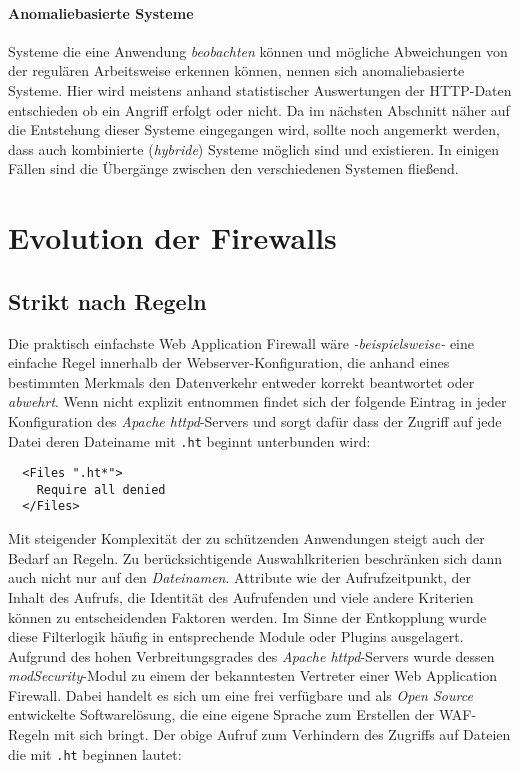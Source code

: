 \paragraph{Anomaliebasierte Systeme}
Systeme die eine Anwendung \emph{beobachten} können und mögliche Abweichungen von der regulären Arbeitsweise erkennen können, nennen sich anomaliebasierte Systeme. Hier wird meistens anhand statistischer Auswertungen der HTTP-Daten entschieden ob ein Angriff erfolgt oder nicht. Da im nächsten Abschnitt näher auf die Entstehung dieser Systeme eingegangen wird, sollte noch angemerkt werden, dass auch kombinierte (\emph{hybride}) Systeme möglich sind und existieren. In einigen Fällen sind die Übergänge zwischen den verschiedenen Systemen fließend.

\section{Evolution der Firewalls}
\label{sec:relatedwork}

\subsection{Strikt nach Regeln}

Die praktisch einfachste Web Application Firewall wäre \emph{-beispielsweise-} eine einfache Regel innerhalb der Webserver-Konfiguration, die anhand eines bestimmten Merkmals den Datenverkehr entweder korrekt beantwortet oder \glqq\emph{abwehrt}\grqq. Wenn nicht explizit entnommen findet sich der folgende Eintrag in jeder Konfiguration des \emph{Apache httpd}-Servers und sorgt dafür dass der Zugriff auf jede Datei deren Dateiname mit \texttt{.ht} beginnt unterbunden wird:

\begin{lstlisting}
  <Files ".ht*">
    Require all denied
  </Files>
\end{lstlisting}

Mit steigender Komplexität der zu schützenden Anwendungen steigt auch der Bedarf an Regeln. Zu berücksichtigende Auswahlkriterien beschränken sich dann auch nicht nur auf den \glqq\emph{Dateinamen}\grqq. Attribute wie der Aufrufzeitpunkt, der Inhalt des Aufrufs, die Identität des Aufrufenden und viele andere Kriterien können zu entscheidenden Faktoren werden. Im Sinne der Entkopplung wurde diese Filterlogik häufig in entsprechende Module oder Plugins ausgelagert. Aufgrund des hohen Verbreitungsgrades des \emph{Apache httpd}-Servers wurde dessen \emph{modSecurity}-Modul zu einem der bekanntesten Vertreter einer Web Application Firewall. Dabei handelt es sich um eine frei verfügbare und als \emph{Open Source} entwickelte Softwarelösung, die eine eigene Sprache zum Erstellen der WAF-Regeln mit sich bringt. Der obige Aufruf zum Verhindern des Zugriffs auf Dateien die mit \texttt{.ht} beginnen lautet:

